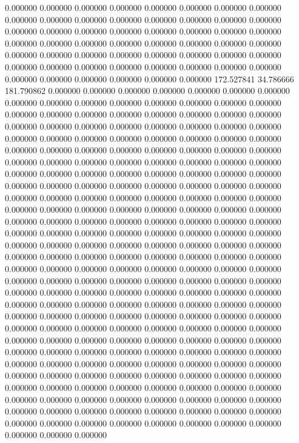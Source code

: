 0.000000 0.000000 0.000000
0.000000 0.000000 0.000000
0.000000 0.000000 0.000000
0.000000 0.000000 0.000000
0.000000 0.000000 0.000000
0.000000 0.000000 0.000000
0.000000 0.000000 0.000000
0.000000 0.000000 0.000000
0.000000 0.000000 0.000000
0.000000 0.000000 0.000000
0.000000 0.000000 0.000000
0.000000 0.000000 0.000000
0.000000 0.000000 0.000000
0.000000 0.000000 0.000000
0.000000 0.000000 0.000000
0.000000 0.000000 0.000000
0.000000 0.000000 0.000000
0.000000 0.000000 0.000000
172.527841 34.786666 181.790862
0.000000 0.000000 0.000000
0.000000 0.000000 0.000000
0.000000 0.000000 0.000000
0.000000 0.000000 0.000000
0.000000 0.000000 0.000000
0.000000 0.000000 0.000000
0.000000 0.000000 0.000000
0.000000 0.000000 0.000000
0.000000 0.000000 0.000000
0.000000 0.000000 0.000000
0.000000 0.000000 0.000000
0.000000 0.000000 0.000000
0.000000 0.000000 0.000000
0.000000 0.000000 0.000000
0.000000 0.000000 0.000000
0.000000 0.000000 0.000000
0.000000 0.000000 0.000000
0.000000 0.000000 0.000000
0.000000 0.000000 0.000000
0.000000 0.000000 0.000000
0.000000 0.000000 0.000000
0.000000 0.000000 0.000000
0.000000 0.000000 0.000000
0.000000 0.000000 0.000000
0.000000 0.000000 0.000000
0.000000 0.000000 0.000000
0.000000 0.000000 0.000000
0.000000 0.000000 0.000000
0.000000 0.000000 0.000000
0.000000 0.000000 0.000000
0.000000 0.000000 0.000000
0.000000 0.000000 0.000000
0.000000 0.000000 0.000000
0.000000 0.000000 0.000000
0.000000 0.000000 0.000000
0.000000 0.000000 0.000000
0.000000 0.000000 0.000000
0.000000 0.000000 0.000000
0.000000 0.000000 0.000000
0.000000 0.000000 0.000000
0.000000 0.000000 0.000000
0.000000 0.000000 0.000000
0.000000 0.000000 0.000000
0.000000 0.000000 0.000000
0.000000 0.000000 0.000000
0.000000 0.000000 0.000000
0.000000 0.000000 0.000000
0.000000 0.000000 0.000000
0.000000 0.000000 0.000000
0.000000 0.000000 0.000000
0.000000 0.000000 0.000000
0.000000 0.000000 0.000000
0.000000 0.000000 0.000000
0.000000 0.000000 0.000000
0.000000 0.000000 0.000000
0.000000 0.000000 0.000000
0.000000 0.000000 0.000000
0.000000 0.000000 0.000000
0.000000 0.000000 0.000000
0.000000 0.000000 0.000000
0.000000 0.000000 0.000000
0.000000 0.000000 0.000000
0.000000 0.000000 0.000000
0.000000 0.000000 0.000000
0.000000 0.000000 0.000000
0.000000 0.000000 0.000000
0.000000 0.000000 0.000000
0.000000 0.000000 0.000000
0.000000 0.000000 0.000000
0.000000 0.000000 0.000000
0.000000 0.000000 0.000000
0.000000 0.000000 0.000000
0.000000 0.000000 0.000000
0.000000 0.000000 0.000000
0.000000 0.000000 0.000000
0.000000 0.000000 0.000000
0.000000 0.000000 0.000000
0.000000 0.000000 0.000000
